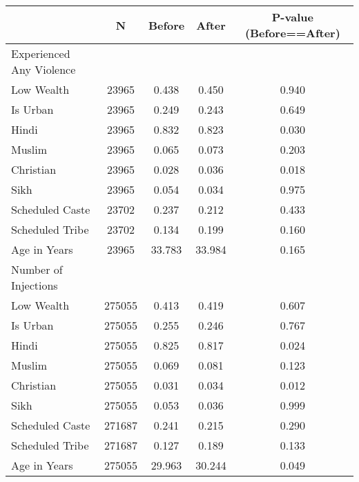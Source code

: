 \begin{tabular}{l*{4}{c}}
\hline\hline
            &           N&      Before&       After&P-value (Before==After)\\
\hline
Experienced Any Violence&            &            &            &            \\
Low Wealth  &       23965&       0.438&       0.450&       0.940\\
Is Urban    &       23965&       0.249&       0.243&       0.649\\
Hindi       &       23965&       0.832&       0.823&       0.030\\
Muslim      &       23965&       0.065&       0.073&       0.203\\
Christian   &       23965&       0.028&       0.036&       0.018\\
Sikh        &       23965&       0.054&       0.034&       0.975\\
Scheduled Caste&       23702&       0.237&       0.212&       0.433\\
Scheduled Tribe&       23702&       0.134&       0.199&       0.160\\
Age in Years&       23965&      33.783&      33.984&       0.165\\
\hline
Number of Injections&            &            &            &            \\
Low Wealth  &      275055&       0.413&       0.419&       0.607\\
Is Urban    &      275055&       0.255&       0.246&       0.767\\
Hindi       &      275055&       0.825&       0.817&       0.024\\
Muslim      &      275055&       0.069&       0.081&       0.123\\
Christian   &      275055&       0.031&       0.034&       0.012\\
Sikh        &      275055&       0.053&       0.036&       0.999\\
Scheduled Caste&      271687&       0.241&       0.215&       0.290\\
Scheduled Tribe&      271687&       0.127&       0.189&       0.133\\
Age in Years&      275055&      29.963&      30.244&       0.049\\
\hline\hline
\end{tabular}
